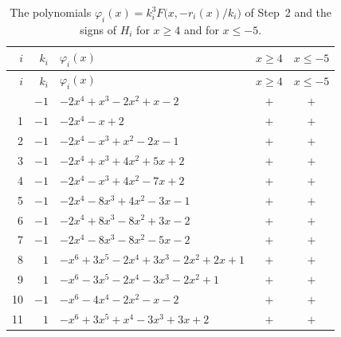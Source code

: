 \documentclass[11pt]{article}
\begin{document}
\begingroup\footnotesize
\setlength{\LTcapwidth}{\textwidth}
\begin{longtable}{@{}rrlcc@{}}
\caption{The polynomials $\varphi_i(x)=k_i^3F\bigl(x,-r_i(x)/k_i\bigr)$ of Step~2 and the signs of $H_i$ for $x\geq4$ and for $x\leq-5$.}\label{tab:phi}\\
\hline $i$ & $k_i$ & $\varphi_i(x)$ & $x\geq4$ & $x\leq-5$\\\hline\endfirsthead\hline $i$ & $k_i$ & $\varphi_i(x)$ & $x\geq4$ & $x\leq-5$\\\hline\endhead\hline\endfoot
0 & $-1$ & $-2x^{4}+x^{3}-2x^{2}+x-2$ & $+$ & $+$\\
1 & $-1$ & $-2x^{4}-x+2$ & $+$ & $+$\\
2 & $-1$ & $-2x^{4}-x^{3}+x^{2}-2x-1$ & $+$ & $+$\\
3 & $-1$ & $-2x^{4}+x^{3}+4x^{2}+5x+2$ & $+$ & $+$\\
4 & $-1$ & $-2x^{4}-x^{3}+4x^{2}-7x+2$ & $+$ & $+$\\
5 & $-1$ & $-2x^{4}-8x^{3}+4x^{2}-3x-1$ & $+$ & $+$\\
6 & $-1$ & $-2x^{4}+8x^{3}-8x^{2}+3x-2$ & $+$ & $+$\\
7 & $-1$ & $-2x^{4}-8x^{3}-8x^{2}-5x-2$ & $+$ & $+$\\
8 & $1$ & $-x^{6}+3x^{5}-2x^{4}+3x^{3}-2x^{2}+2x+1$ & $+$ & $+$\\
9 & $1$ & $-x^{6}-3x^{5}-2x^{4}-3x^{3}-2x^{2}+1$ & $+$ & $+$\\
10 & $-1$ & $-x^{6}-4x^{4}-2x^{2}-x-2$ & $+$ & $+$\\
11 & $1$ & $-x^{6}+3x^{5}+x^{4}-3x^{3}+3x+2$ & $+$ & $+$\\
\end{longtable}
\endgroup
\end{document}
